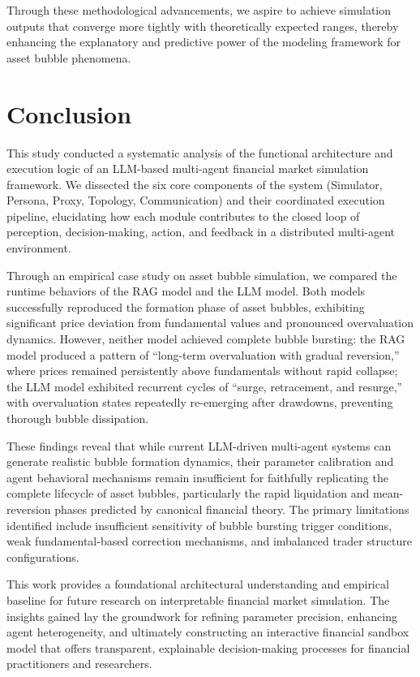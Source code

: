 \documentclass{article}
\begin{document}
Through these methodological advancements, we aspire to achieve simulation outputs that converge more tightly with theoretically expected ranges, thereby enhancing the explanatory and predictive power of the modeling framework for asset bubble phenomena.


\section{Conclusion}
\label{sec:conclusion}

This study conducted a systematic analysis of the functional architecture and execution logic of an LLM-based multi-agent financial market simulation framework. We dissected the six core components of the system (Simulator, Persona, Proxy, Topology, Communication) and their coordinated execution pipeline, elucidating how each module contributes to the closed loop of perception, decision-making, action, and feedback in a distributed multi-agent environment.

Through an empirical case study on asset bubble simulation, we compared the runtime behaviors of the RAG model and the LLM model. Both models successfully reproduced the formation phase of asset bubbles, exhibiting significant price deviation from fundamental values and pronounced overvaluation dynamics. However, neither model achieved complete bubble bursting: the RAG model produced a pattern of ``long-term overvaluation with gradual reversion,'' where prices remained persistently above fundamentals without rapid collapse; the LLM model exhibited recurrent cycles of ``surge, retracement, and resurge,'' with overvaluation states repeatedly re-emerging after drawdowns, preventing thorough bubble dissipation.

These findings reveal that while current LLM-driven multi-agent systems can generate realistic bubble formation dynamics, their parameter calibration and agent behavioral mechanisms remain insufficient for faithfully replicating the complete lifecycle of asset bubbles, particularly the rapid liquidation and mean-reversion phases predicted by canonical financial theory. The primary limitations identified include insufficient sensitivity of bubble bursting trigger conditions, weak fundamental-based correction mechanisms, and imbalanced trader structure configurations.

This work provides a foundational architectural understanding and empirical baseline for future research on interpretable financial market simulation. The insights gained lay the groundwork for refining parameter precision, enhancing agent heterogeneity, and ultimately constructing an interactive financial sandbox model that offers transparent, explainable decision-making processes for financial practitioners and researchers.




\end{document}

